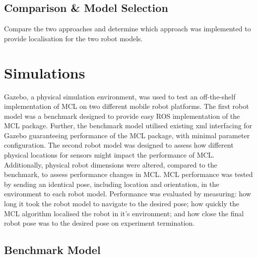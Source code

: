 \documentclass[a4paper]{article}
\begin{document}
\subsection{Comparison \& Model Selection}
Compare the two approaches and determine which approach was implemented to provide localisation for the two robot models.

\section{Simulations}
Gazebo, a physical simulation environment, was used to test an off-the-shelf implementation of MCL on two different mobile robot platforms. The first robot model was a benchmark designed to provide easy ROS implementation of the MCL package. Further, the benchmark model utilised existing xml interfacing for Gazebo guaranteeing performance of the MCL package, with minimal parameter configuration. The second robot model was designed to assess how different physical locations for sensors might impact the performance of MCL. Additionally, physical robot dimensions were altered, compared to the benchmark, to assess performance changes in MCL. MCL performance was tested by sending an identical pose, including location and orientation, in the environment to each robot model. Performance was evaluated by measuring: how long it took the robot model to navigate to the desired pose; how quickly the MCL algorithm localised the robot in it's environment; and how close the final robot pose was to the desired pose on experiment termination.

\subsection{Benchmark Model}
\end{document}
